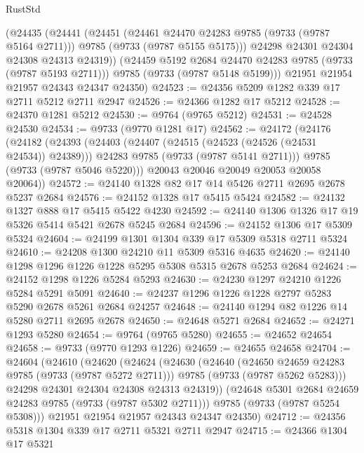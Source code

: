 \begin{lexlean}{RustStd}
\begin{coremodule}
        (@24435
          (@24441
            (@24451
              (@24461 @24470 @24283 @9785 (@9733 (@9787 @5164 @2711)))
              @9785
              (@9733 (@9787 @5155 @5175)))
            @24298
            @24301
            @24304
            @24308
            @24313
            @24319))
        (@24459 @5192 @2684 @24470 @24283 @9785 (@9733 (@9787 @5193 @2711)))
        @9785
        (@9733 (@9787 @5148 @5199)))
      @21951
      @21954
      @21957
      @24343
      @24347
      @24350)
@24523 := @24356 @5209 @1282 @339 @17 @2711 @5212 @2711 @2947
@24526 := @24366 @1282 @17 @5212
@24528 := @24370 @1281 @5212
@24530 := @9764 (@9765 @5212)
@24531 := @24528 @24530
@24534 := @9733 (@9770 @1281 @17)
@24562 := @24172
    (@24176
      (@24182
        (@24393
          (@24403
            (@24407 (@24515 (@24523 (@24526 (@24531 @24534)) @24389)))
            @24283
            @9785
            (@9733 (@9787 @5141 @2711)))
          @9785
          (@9733 (@9787 @5046 @5220)))
        @20043
        @20046
        @20049
        @20053
        @20058
        @20064))
@24572 := @24140 @1328 @82 @17 @14 @5426 @2711 @2695 @2678 @5237 @2684
@24576 := @24152 @1328 @17 @5415 @5424
@24582 := @24132 @1327 @888 @17 @5415 @5422 @4230
@24592 := @24140 @1306 @1326 @17 @19 @5326 @5414 @5421 @2678 @5245 @2684
@24596 := @24152 @1306 @17 @5309 @5324
@24604 := @24199 @1301 @1304 @339 @17 @5309 @5318 @2711 @5324
@24610 := @24208 @1300 @24210 @11 @5309 @5316 @4635
@24620 := @24140 @1298 @1296 @1226 @1228 @5295 @5308 @5315 @2678 @5253 @2684
@24624 := @24152 @1298 @1226 @5284 @5293
@24630 := @24230 @1297 @24210 @1226 @5284 @5291 @5091
@24640 := @24237 @1296 @1226 @1228 @2797 @5283 @5290 @2678 @5261 @2684 @24257
@24648 := @24140 @1294 @82 @1226 @14 @5280 @2711 @2695 @2678
@24650 := @24648 @5271 @2684
@24652 := @24271 @1293 @5280
@24654 := @9764 (@9765 @5280)
@24655 := @24652 @24654
@24658 := @9733 (@9770 @1293 @1226)
@24659 := @24655 @24658
@24704 := @24604
    (@24610
      (@24620
        (@24624
          (@24630
            (@24640
              (@24650 @24659 @24283 @9785 (@9733 (@9787 @5272 @2711)))
              @9785
              (@9733 (@9787 @5262 @5283)))
            @24298
            @24301
            @24304
            @24308
            @24313
            @24319))
        (@24648 @5301 @2684 @24659 @24283 @9785 (@9733 (@9787 @5302 @2711)))
        @9785
        (@9733 (@9787 @5254 @5308)))
      @21951
      @21954
      @21957
      @24343
      @24347
      @24350)
@24712 := @24356 @5318 @1304 @339 @17 @2711 @5321 @2711 @2947
@24715 := @24366 @1304 @17 @5321

\end{coremodule}
\end{lexlean}
